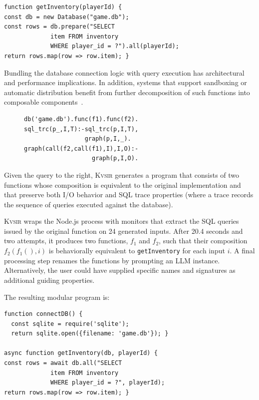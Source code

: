 \documentclass[sigplan,review,anonymous,10pt]{acmart}
\newcommand{\sys}{{\scshape Kv{\textalpha}sir}\xspace}
\begin{document}
\begin{verbatim}
function getInventory(playerId) {
const db = new Database("game.db");
const rows = db.prepare("SELECT
             item FROM inventory
             WHERE player_id = ?").all(playerId);
return rows.map(row => row.item); }
\end{verbatim}

Bundling the database connection logic with query execution has architectural
and performance implications. In addition, systems that support sandboxing or
automatic distribution benefit from further decomposition of such functions
into composable components~\cite{Towards_Modern_Ghemaw_2023, vasilakis2019ignis, vasilakis2018breakapp}.

\begin{figure}
  \begin{verbatim}
db('game.db').func(f1).func(f2).
sql_trc(p_,I,T):-sql_trc(p,I,T),
                 graph(p,I,_).
graph(call(f2,call(f1),I),I,O):-
                   graph(p,I,O).
  \end{verbatim}
\end{figure}

Given the query to the right, \sys generates a program that consists of two
functions whose composition is equivalent to the original implementation and
that preserve both I/O behavior and SQL trace properties (where a trace records
the sequence of queries executed against the database).

\sys wraps the Node.js process with monitors that extract the SQL queries
issued by the original function on 24 generated inputs.
After 20.4 seconds and
two attempts, it produces two functions, $f_1$ and $f_2$, such that their
composition $f_2(f_1(), i)$ is behaviorally equivalent to \texttt{getInventory}
for each input $i$.
A final processing step renames the functions by prompting
an LLM instance.
Alternatively, the user could have supplied specific names and
signatures as additional guiding properties.

The resulting modular program is:
\begin{verbatim}
function connectDB() {
  const sqlite = require('sqlite');
  return sqlite.open({filename: 'game.db'}); }

async function getInventory(db, playerId) {
const rows = await db.all("SELECT 
             item FROM inventory
             WHERE player_id = ?", playerId);
return rows.map(row => row.item); }
\end{verbatim}
\end{document}

